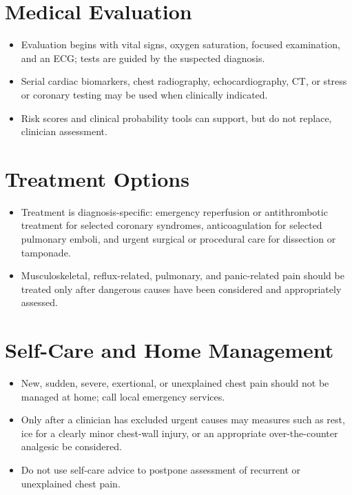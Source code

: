 \section*{Medical Evaluation}
\begin{itemize}
  \item Evaluation begins with vital signs, oxygen saturation, focused examination, and an ECG; tests are guided by the suspected diagnosis.
  \item Serial cardiac biomarkers, chest radiography, echocardiography, CT, or stress or coronary testing may be used when clinically indicated.
  \item Risk scores and clinical probability tools can support, but do not replace, clinician assessment.
\end{itemize}

\section*{Treatment Options}
\begin{itemize}
  \item Treatment is diagnosis-specific: emergency reperfusion or antithrombotic treatment for selected coronary syndromes, anticoagulation for selected pulmonary emboli, and urgent surgical or procedural care for dissection or tamponade.
  \item Musculoskeletal, reflux-related, pulmonary, and panic-related pain should be treated only after dangerous causes have been considered and appropriately assessed.
\end{itemize}

\section*{Self-Care and Home Management}
\begin{itemize}
  \item New, sudden, severe, exertional, or unexplained chest pain should not be managed at home; call local emergency services.
  \item Only after a clinician has excluded urgent causes may measures such as rest, ice for a clearly minor chest-wall injury, or an appropriate over-the-counter analgesic be considered.
  \item Do not use self-care advice to postpone assessment of recurrent or unexplained chest pain.
\end{itemize}

